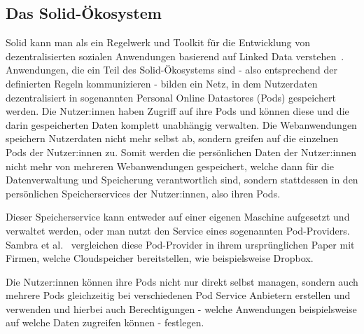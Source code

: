\documentclass[acmtog]{acmart}
\begin{document}
\subsection{Das Solid-Ökosystem}


Solid kann man als ein Regelwerk und Toolkit für die Entwicklung von dezentralisierten sozialen Anwendungen basierend auf Linked Data verstehen~\cite{ramachandran2020towards}. Anwendungen, die ein Teil des Solid-Ökosystems sind - also entsprechend der definierten Regeln kommunizieren - bilden ein Netz, in dem Nutzerdaten dezentralisiert in sogenannten Personal Online Datastores (Pods) gespeichert werden. Die Nutzer:innen haben Zugriff auf ihre Pods und können diese und die darin gespeicherten Daten komplett unabhängig verwalten. Die Webanwendungen speichern Nutzerdaten nicht mehr selbst ab, sondern greifen auf die einzelnen Pods der Nutzer:innen zu. Somit werden die persönlichen Daten der Nutzer:innen nicht mehr von mehreren Webanwendungen gespeichert, welche dann für die Datenverwaltung und Speicherung verantwortlich sind, sondern stattdessen in den persönlichen Speicherservices der Nutzer:innen, also ihren Pods.


Dieser Speicherservice kann entweder auf einer eigenen Maschine aufgesetzt und verwaltet werden, oder man nutzt den Service eines sogenannten Pod-Providers. Sambra et al.~\cite{sambra2016solid} vergleichen diese Pod-Provider in ihrem ursprünglichen Paper mit Firmen, welche Cloudspeicher bereitstellen, wie beispielsweise Dropbox.

Die Nutzer:innen können ihre Pods nicht nur direkt selbst managen, sondern auch mehrere Pods gleichzeitig bei verschiedenen Pod Service Anbietern erstellen und verwenden und hierbei auch Berechtigungen - welche Anwendungen beispielsweise auf welche Daten zugreifen können - festlegen.
\end{document}
